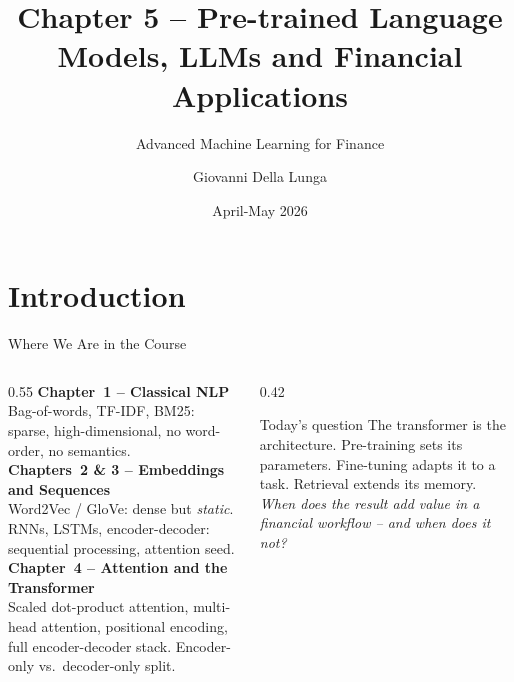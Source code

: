 \documentclass[11pt,aspectratio=169,professionalfonts]{beamer}
\title{Chapter 5 -- Pre-trained Language Models, LLMs and Financial Applications}
\subtitle{Advanced Machine Learning for Finance}
\author{Giovanni Della Lunga}
\institute{University of Bologna}
\date{April-May 2026}
\begin{document}
%
%
\begin{frame}
    \titlepage
\end{frame}
%
\section{Introduction}
%
\begin{frame}{Where We Are in the Course}
  \begin{columns}[T]
    \begin{column}{0.55\linewidth}
      \textbf{Chapter~1 -- Classical NLP}\\
      Bag-of-words, TF-IDF, BM25: sparse,
      high-dimensional, no word-order, no semantics.\\[0.5em]
      \textbf{Chapters~2 \& 3 -- Embeddings and Sequences}\\
      Word2Vec / GloVe: dense but \emph{static}.
      RNNs, LSTMs, encoder-decoder: sequential
      processing, attention seed.\\[0.5em]
      \textbf{Chapter~4 -- Attention and the Transformer}\\
      Scaled dot-product attention, multi-head attention,
      positional encoding, full encoder-decoder stack.
      Encoder-only vs.\ decoder-only split.
    \end{column}
    \begin{column}{0.42\linewidth}
      \begin{block}{Today's question}
        The transformer is the architecture.
        Pre-training sets its parameters.
        Fine-tuning adapts it to a task.
        Retrieval extends its memory.\\[0.4em]
        \emph{When does the result
        add value in a financial workflow --
        and when does it not?}
      \end{block}
    \end{column}
  \end{columns}
\end{frame}
%
%
\end{document}
